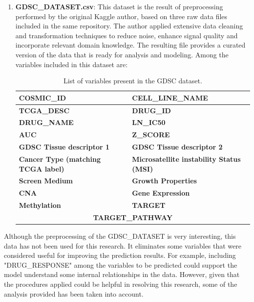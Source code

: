 \begin{enumerate}
    \item \textbf{GDSC\_DATASET.csv}: This dataset is the result of preprocessing performed by the original Kaggle author, based on three raw data files included in the same repository. The author applied extensive data cleaning and transformation techniques to reduce noise, enhance signal quality and incorporate relevant domain knowledge. The resulting file provides a curated version of the data that is ready for analysis and modeling. Among the variables included in this dataset are:
    \begin{table}[H]
        \centering
        \begin{tabular}{|l|l|}
        \hline
        \textbf{COSMIC\_ID} & \textbf{CELL\_LINE\_NAME} \\ \hline
        \textbf{TCGA\_DESC} & \textbf{DRUG\_ID} \\ \hline
        \textbf{DRUG\_NAME} & \textbf{LN\_IC50} \\ \hline
        \textbf{AUC} & \textbf{Z\_SCORE} \\ \hline
        \textbf{GDSC Tissue descriptor 1} & \textbf{GDSC Tissue descriptor 2} \\ \hline
        \textbf{Cancer Type (matching TCGA label)} & \textbf{Microsatellite instability Status (MSI)} \\ \hline
        \textbf{Screen Medium} & \textbf{Growth Properties} \\ \hline
        \textbf{CNA} & \textbf{Gene Expression} \\ \hline
        \textbf{Methylation} & \textbf{TARGET} \\ \hline
        \multicolumn{2}{|c|}{\textbf{TARGET\_PATHWAY}} \\ \hline
        \end{tabular}
        \caption{List of variables present in the GDSC dataset.}
        \label{tab:gdsc_vars}
        \end{table}
\end{enumerate}

Although the preprocessing of the GDSC\_DATASET is very interesting, this data has not been used for this research. It eliminates some variables that were considered useful for improving the prediction results. For example, including "DRUG\_RESPONSE" among the variables to be predicted could support the model understand some internal relationships in the data. However, given that the procedures applied could be helpful in resolving this research, some of the analysis provided has been taken into account.


